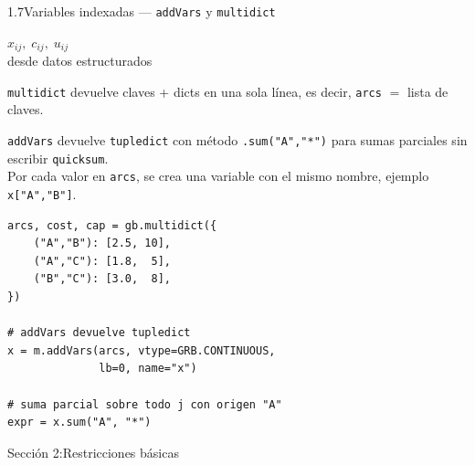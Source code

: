 \documentclass[10pt,a4paper]{article}
\newlength{\mathcolw}
\newlength{\codecolw}
\newcommand{\secheader}[2]{%
  \vspace{10pt}%
  \needspace{6cm}%
  \noindent%
  \begin{tcolorbox}[
    colback=sectionbg, colupper=white,
    colframe=sectionbg, sharp corners,
    left=8pt, right=8pt, top=5pt, bottom=5pt,
    fontupper=\large\bfseries\sffamily,
  ]
  Secci\'on #1:\enspace #2
  \end{tcolorbox}%
  \vspace{2pt}%
}
\newcommand{\entryheader}[1]{%
  \needspace{5cm}%
  \vspace{6pt}%
  \noindent%
  \begin{tcolorbox}[
    colback=subsecbg!18,
    colframe=subsecbg!45,
    sharp corners, boxrule=0.4pt,
    left=5pt, right=5pt, top=2pt, bottom=2pt,
    fontupper=\small\bfseries\sffamily,
  ]
  #1
  \end{tcolorbox}%
  \vspace{2pt}%
}
\newcommand{\py}[1]{\texttt{\small #1}}
\begin{document}
\entryheader{1.7\quad Variables indexadas --- \py{addVars} y \py{multidict}}
\noindent
\begin{minipage}[t]{\mathcolw}
    \begin{tcolorbox}[mathbox]
        $x_{ij},\; c_{ij},\; u_{ij}$\\[4pt]
        desde datos estructurados
    \end{tcolorbox}
    \vspace{1pt}
    \begin{tcolorbox}[notebox]
        \py{multidict} devuelve claves + dicts en una sola l\'inea, es decir, \py{arcs} $=$ lista de claves.
    \end{tcolorbox}
    \vspace{1pt}
    \begin{tcolorbox}[notebox]
        \py{addVars} devuelve \py{tupledict} con m\'etodo \py{.sum("A","*")} para sumas parciales sin escribir \py{quicksum}.\\
        Por cada valor en \py{arcs}, se crea una variable con el mismo nombre, ejemplo \py{x["A","B"]}.
    \end{tcolorbox}
\end{minipage}\hspace{0.02\textwidth}%
\begin{minipage}[t]{\codecolw}
    \begin{lstlisting}[style=gurobipy]
arcs, cost, cap = gb.multidict({
    ("A","B"): [2.5, 10],
    ("A","C"): [1.8,  5],
    ("B","C"): [3.0,  8],
})

# addVars devuelve tupledict
x = m.addVars(arcs, vtype=GRB.CONTINUOUS,
              lb=0, name="x")

# suma parcial sobre todo j con origen "A"
expr = x.sum("A", "*")
\end{lstlisting}
\end{minipage}

\vspace{4pt}

\secheader{2}{Restricciones b\'asicas}
\end{document}
